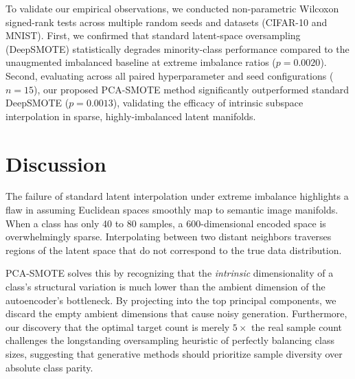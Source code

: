 \documentclass[5p,times]{elsarticle}
\begin{document}
To validate our empirical observations, we conducted non-parametric Wilcoxon
signed-rank tests \citep{wilcoxon1945individual} across multiple random seeds and datasets (CIFAR-10 and MNIST).
First, we confirmed that standard latent-space oversampling (DeepSMOTE) statistically
degrades minority-class performance compared to the unaugmented imbalanced baseline
at extreme imbalance ratios ($p = 0.0020$).
Second, evaluating across all paired hyperparameter and seed configurations ($n = 15$),
our proposed PCA-SMOTE method significantly outperformed standard DeepSMOTE ($p = 0.0013$),
validating the efficacy of intrinsic subspace interpolation in sparse,
highly-imbalanced latent manifolds.

\section{Discussion}
\label{sec:discussion}
The failure of standard latent interpolation under extreme imbalance highlights a flaw in assuming Euclidean spaces smoothly map to semantic image manifolds. When a class has only 40 to 80 samples, a 600-dimensional encoded space is overwhelmingly sparse. Interpolating between two distant neighbors traverses regions of the latent space that do not correspond to the true data distribution. 

PCA-SMOTE solves this by recognizing that the \emph{intrinsic} dimensionality of a class's structural variation is much lower than the ambient dimension of the autoencoder's bottleneck. By projecting into the top principal components, we discard the empty ambient dimensions that cause noisy generation. Furthermore, our discovery that the optimal target count is merely $5\times$ the real sample count challenges the longstanding oversampling heuristic of perfectly balancing class sizes, suggesting that generative methods should prioritize sample diversity over absolute class parity.

\end{document}
